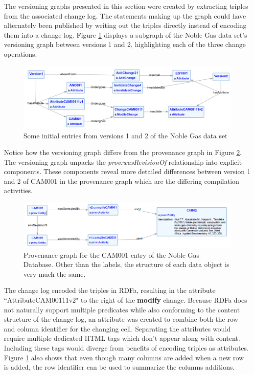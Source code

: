 The versioning graphs presented in this section were created by extracting triples from the associated change log.
The statements making up the graph could have alternately been published by writing out the triples directly instead of encoding them into a change log.
Figure \ref{NobleGraph1} displays a subgraph of the Noble Gas data set's versioning graph between versions 1 and 2, highlighting each of the three change operations.
\begin{figure}
	\centering
	\includegraphics[scale=0.30]{figures/NobleVersion.png}
	\caption{Some initial entries from versions 1 and 2 of the Noble Gas data set}
	\label{NobleGraph1}
\end{figure}
Notice how the versioning graph differs from the provenance graph in Figure \ref{CAM001ProvGraph}.
The versioning graph unpacks the \textit{prov:wasRevisionOf} relationship into explicit components.
These components reveal more detailed differences between version 1 and 2 of CAM001 in the provenance graph which are the differing compilation activities.
\begin{figure}[b]
	\centering
	\includegraphics[scale=0.70]{figures/CAM001v1v2.png}
	\caption{Provenance graph for the CAM001 entry of the Noble Gas Database.  Other than the labels, the structure of each data object is very much the same.}
	\label{CAM001ProvGraph}
\end{figure}
The change log encoded the triples in RDFa, resulting in the attribute ``AttributeCAM00111v2" to the right of the \textbf{modify} change.
Because RDFa does not naturally support multiple predicates while also conforming to the content structure of the change log, an attribute was created to combine both the row and column identifier for the changing cell.
Separating the attributes would require multiple dedicated HTML tags which don't appear along with content.
Including these tags would diverge from benefits of encoding triples as attributes.
Figure \ref{NobleGraph1} also shows that even though many columns are added when a new row is added, the row identifier can be used to summarize the columns additions.

